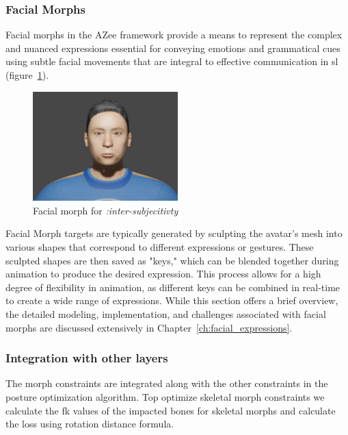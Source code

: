 \documentclass[../../main.tex]{subfiles}
\begin{document}
\subsubsection{Facial Morphs}
\label{ch:avatar_creation_pose_synthesis:proc_rig_signing_avatars:morph_constraints:facial_morphs}

Facial morphs in the AZee framework provide a means to represent the complex and nuanced expressions essential for conveying emotions and grammatical cues using subtle facial movements that are integral to effective communication in \gls{sl} (figure~\ref{fig:facial_example}).

\begin{figure}
    \centering
    \includegraphics[width=0.5\textwidth]{chapters/avatar_creation_pose_synthesis/images/facial_example.png}
    \caption{Facial morph for \emph{:inter-subjecitivty}}
    \label{fig:facial_example}
\end{figure}

Facial Morph targets are typically generated by sculpting the avatar's mesh into various shapes that correspond to different expressions or gestures. These sculpted shapes are then saved as "keys," which can be blended together during animation to produce the desired expression. This process allows for a high degree of flexibility in animation, as different keys can be combined in real-time to create a wide range of expressions. While this section offers a brief overview, the detailed modeling, implementation, and challenges associated with facial morphs are discussed extensively in Chapter~\ref{ch:facial_expressions}.

\subsubsection{Integration with other layers}
\label{ch:avatar_creation_pose_synthesis:proc_rig_signing_avatars:morph_constraints:integration}

The morph constraints are integrated along with the other constraints in the posture optimization algorithm. Top optimize skeletal morph constraints we calculate the \gls{fk} values of the impacted bones for skeletal morphs and calculate the loss using rotation distance formula.
\end{document}
